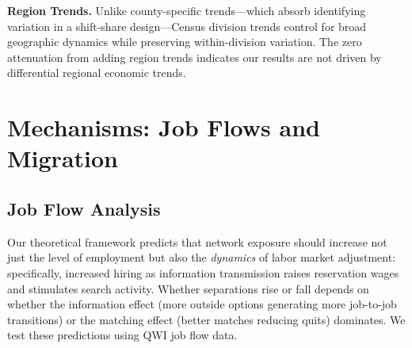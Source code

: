\documentclass[12pt]{article}
\begin{document}
\textbf{Region Trends.} Unlike county-specific trends---which absorb identifying variation in a shift-share design---Census division trends control for broad geographic dynamics while preserving within-division variation. The zero attenuation from adding region trends indicates our results are not driven by differential regional economic trends.


\section{Mechanisms: Job Flows and Migration}
\label{sec:mechanisms}

\subsection{Job Flow Analysis}

Our theoretical framework predicts that network exposure should increase not just the level of employment but also the \textit{dynamics} of labor market adjustment: specifically, increased hiring as information transmission raises reservation wages and stimulates search activity. Whether separations rise or fall depends on whether the information effect (more outside options generating more job-to-job transitions) or the matching effect (better matches reducing quits) dominates. We test these predictions using QWI job flow data.
\end{document}
